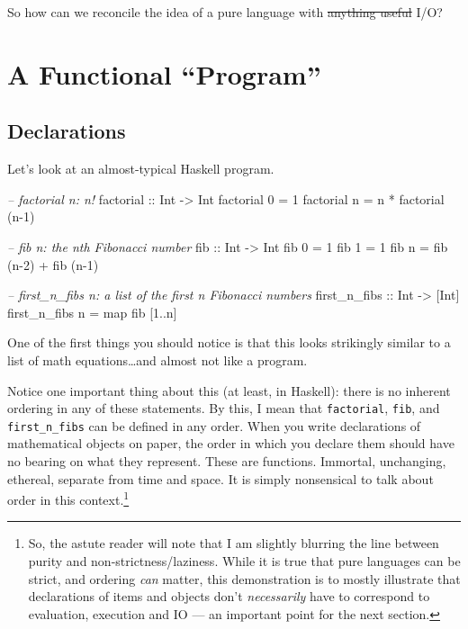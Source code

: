 \documentclass[]{article}
\newenvironment{Shaded}{}{}
\newcommand{\DataTypeTok}[1]{\textcolor[rgb]{0.56,0.13,0.00}{{#1}}}
\newcommand{\DecValTok}[1]{\textcolor[rgb]{0.25,0.63,0.44}{{#1}}}
\newcommand{\CommentTok}[1]{\textcolor[rgb]{0.38,0.63,0.69}{\textit{{#1}}}}
\newcommand{\OtherTok}[1]{\textcolor[rgb]{0.00,0.44,0.13}{{#1}}}
\newcommand{\FunctionTok}[1]{\textcolor[rgb]{0.02,0.16,0.49}{{#1}}}
\newcommand{\NormalTok}[1]{{#1}}
\begin{document}
So how can we reconcile the idea of a pure language with \sout{anything useful} I/O?

\section{\texorpdfstring{A Functional
``Program''}{A Functional Program}}\label{a-functional-program}

\subsection{Declarations}\label{declarations}

Let's look at an almost-typical Haskell program.

\begin{Shaded}
\begin{Highlighting}[]
\CommentTok{--  factorial n: n!}
\OtherTok{factorial ::} \DataTypeTok{Int} \OtherTok{->} \DataTypeTok{Int}
\NormalTok{factorial }\DecValTok{0} \FunctionTok{=} \DecValTok{1}
\NormalTok{factorial n }\FunctionTok{=} \NormalTok{n }\FunctionTok{*} \NormalTok{factorial (n}\FunctionTok{-}\DecValTok{1}\NormalTok{)}

\CommentTok{--  fib n: the nth Fibonacci number}
\OtherTok{fib ::} \DataTypeTok{Int} \OtherTok{->} \DataTypeTok{Int}
\NormalTok{fib }\DecValTok{0} \FunctionTok{=} \DecValTok{1}
\NormalTok{fib }\DecValTok{1} \FunctionTok{=} \DecValTok{1}
\NormalTok{fib n }\FunctionTok{=} \NormalTok{fib (n}\FunctionTok{-}\DecValTok{2}\NormalTok{) }\FunctionTok{+} \NormalTok{fib (n}\FunctionTok{-}\DecValTok{1}\NormalTok{)}

\CommentTok{--  first_n_fibs n: a list of the first n Fibonacci numbers}
\OtherTok{first_n_fibs ::} \DataTypeTok{Int} \OtherTok{->} \NormalTok{[}\DataTypeTok{Int}\NormalTok{]}
\NormalTok{first_n_fibs n }\FunctionTok{=} \NormalTok{map fib [}\DecValTok{1}\FunctionTok{..}\NormalTok{n]}
\end{Highlighting}
\end{Shaded}

One of the first things you should notice is that this looks strikingly similar to a list of math
equations\ldots{}and almost not like a program.

Notice one important thing about this (at least, in Haskell): there is no inherent ordering in any
of these statements. By this, I mean that \texttt{factorial}, \texttt{fib}, and
\texttt{first\_n\_fibs} can be defined in any order. When you write declarations of mathematical
objects on paper, the order in which you declare them should have no bearing on what they represent.
These are functions. Immortal, unchanging, ethereal, separate from time and space. It is simply
nonsensical to talk about order in this context.\footnote{So, the astute reader will note that I am
  slightly blurring the line between purity and non-strictness/laziness. While it is true that pure
  languages can be strict, and ordering \emph{can} matter, this demonstration is to mostly
  illustrate that declarations of items and objects don't \emph{necessarily} have to correspond to
  evaluation, execution and IO --- an important point for the next section.}
\end{document}
